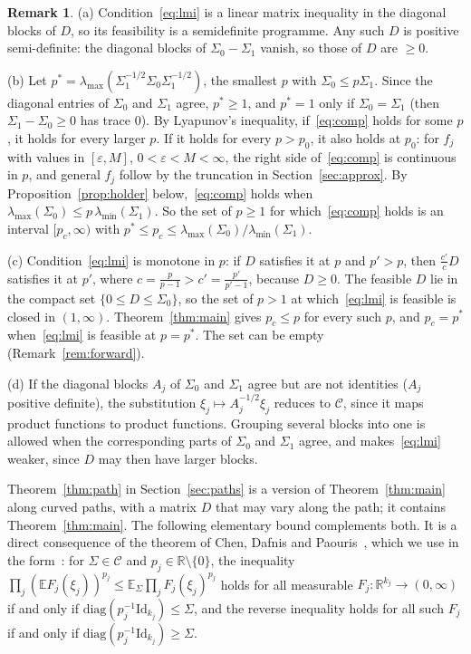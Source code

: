 \documentclass[11pt]{amsart}
\theoremstyle{definition}
\newtheorem{remark}[theorem]{Remark}
\newcommand{\E}{\mathbb{E}}
\newcommand{\R}{\mathbb{R}}
\newcommand{\Id}{\mathrm{Id}}
\begin{document}
\begin{remark}\label{rem:basic}
(a) Condition~\eqref{eq:lmi} is a linear matrix inequality in the diagonal blocks of $D$, so its feasibility is a
semidefinite programme. Any such $D$ is positive semi-definite: the diagonal blocks of $\Sigma_0-\Sigma_1$ vanish, so
those of $D$ are $\ge0$.

(b) Let $p^*=\lambda_{\max}(\Sigma_1^{-1/2}\Sigma_0\Sigma_1^{-1/2})$, the smallest $p$ with $\Sigma_0\le p\Sigma_1$.
Since the diagonal entries of $\Sigma_0$ and $\Sigma_1$ agree, $p^*\ge1$, and $p^*=1$ only if $\Sigma_0=\Sigma_1$
(then $\Sigma_1-\Sigma_0\ge0$ has trace $0$). By Lyapunov's inequality, if~\eqref{eq:comp} holds for some $p$, it
holds for every larger $p$. If it holds for every $p>p_0$, it also holds at $p_0$: for $f_j$ with values in
$[\varepsilon,M]$, $0<\varepsilon<M<\infty$, the right side of~\eqref{eq:comp} is continuous in $p$, and general $f_j$
follow by the truncation in Section~\ref{sec:approx}. By Proposition~\ref{prop:holder} below,~\eqref{eq:comp} holds
when $\lambda_{\max}(\Sigma_0)\le p\,\lambda_{\min}(\Sigma_1)$. So the set of $p\ge1$ for which~\eqref{eq:comp} holds is
an interval $[p_c,\infty)$ with $p^*\le p_c\le\lambda_{\max}(\Sigma_0)/\lambda_{\min}(\Sigma_1)$.

(c) Condition~\eqref{eq:lmi} is monotone in $p$: if $D$ satisfies it at $p$ and $p'>p$, then $\frac{c'}cD$ satisfies
it at $p'$, where $c=\frac p{p-1}>c'=\frac{p'}{p'-1}$, because $D\ge0$. The feasible $D$ lie in the compact set
$\{0\le D\le\Sigma_0\}$, so the set of $p>1$ at which~\eqref{eq:lmi} is feasible is closed in $(1,\infty)$. Theorem~\ref{thm:main}
gives $p_c\le p$ for every such $p$, and $p_c=p^*$ when~\eqref{eq:lmi} is feasible at $p=p^*$. The set can be empty
(Remark~\ref{rem:forward}).

(d) If the diagonal blocks $A_j$ of $\Sigma_0$ and $\Sigma_1$ agree but are not identities ($A_j$ positive definite),
the substitution $\xi_j\mapsto A_j^{-1/2}\xi_j$ reduces to $\mathcal C$, since it maps product functions to product
functions. Grouping several blocks into one is allowed when the corresponding parts of $\Sigma_0$ and $\Sigma_1$
agree, and makes~\eqref{eq:lmi} weaker, since $D$ may then have larger blocks.
\end{remark}

Theorem~\ref{thm:path} in Section~\ref{sec:paths} is a version of Theorem~\ref{thm:main} along curved paths, with a
matrix $D$ that may vary along the path; it contains Theorem~\ref{thm:main}. The following elementary bound
complements both. It is a direct consequence of the theorem of
Chen, Dafnis and Paouris~\cite{CDP15}, which we use in the form~\cite[Theorem~B]{IK25}: for $\Sigma\in\mathcal C$ and
$p_j\in\R\setminus\{0\}$, the inequality $\prod_j(\E F_j(\xi_j))^{p_j}\le\E_\Sigma\prod_jF_j(\xi_j)^{p_j}$ holds for all
measurable $F_j:\R^{k_j}\to(0,\infty)$ if and only if $\mathrm{diag}(p_j^{-1}\Id_{k_j})\le\Sigma$, and the reverse
inequality holds for all such $F_j$ if and only if $\mathrm{diag}(p_j^{-1}\Id_{k_j})\ge\Sigma$.
\end{document}
